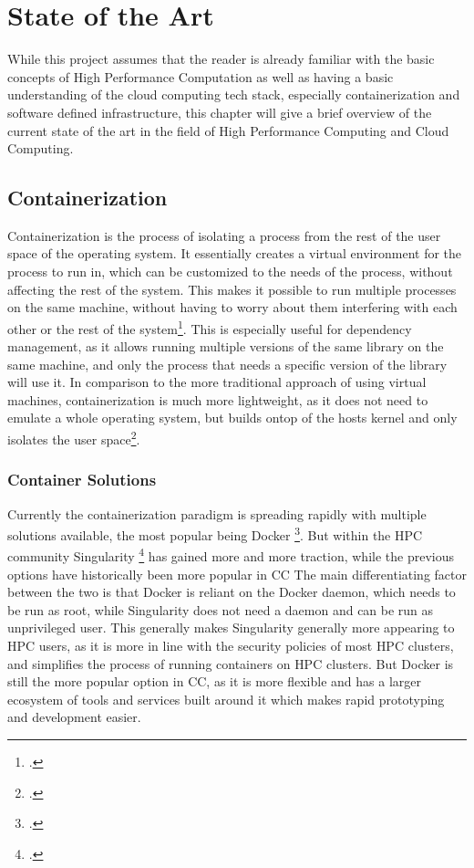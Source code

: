 \chapter{State of the Art}
\label{State_of_the_Art}

While this project assumes that the reader is already familiar with the basic concepts of High Performance Computation
as well as having a basic understanding of the cloud computing tech stack, especially containerization and software defined infrastructure,
this chapter will give a brief overview of the current state of the art in the field of High Performance Computing and Cloud Computing.

\section{Containerization}

Containerization is the process of isolating a process from the rest of the user space of the operating system.
It essentially creates a virtual environment for the process to run in, which can be customized to the needs of the process, without affecting the rest of the system.
This makes it possible to run multiple processes on the same machine, without having to worry about them interfering with each other or the rest of the system\footcite{IEEEXploreFullText}.
This is especially useful for dependency management, as it allows running multiple versions of the same library on the same machine, and only the process that needs a specific version of the library will use it.
In comparison to the more traditional approach of using virtual machines, containerization is much more lightweight, as it does not need to emulate a whole operating system, 
but builds ontop of the hosts kernel and only isolates the user space\footcite{WhatContainerDocker}.

\subsection*{Container Solutions}

Currently the containerization paradigm is spreading rapidly with multiple solutions available, the most popular being Docker \footcite{StackOverflowDeveloper}.
But within the \ac{HPC} community Singularity \footcite{IntroductionSoftwareContainers} has gained more and more traction, while the previous options have historically been more popular in \ac{CC}
The main differentiating factor between the two is that Docker is reliant on the Docker daemon, which needs to be run as root, while Singularity does not need a daemon and can be run as unprivileged user.
This generally makes Singularity generally more appearing to \ac{HPC} users, as it is more in line with the security policies of most \ac{HPC} clusters, and simplifies the process of running containers on \ac{HPC} clusters.
But Docker is still the more popular option in \ac{CC}, as it is more flexible and has a larger ecosystem of tools and services built around it which makes rapid prototyping and development easier.

